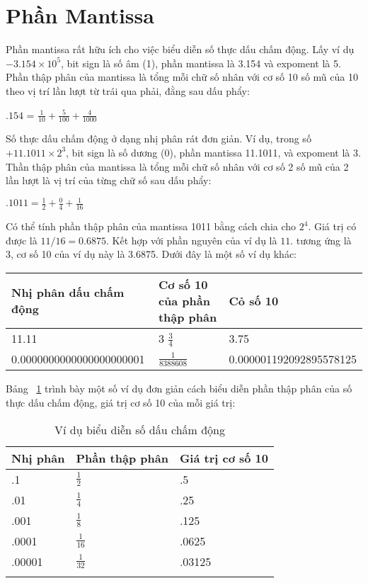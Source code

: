  \section*{Phần Mantissa}
 	Phần mantissa rất hữu ích cho việc biểu diễn số thực dấu chấm động. Lấy ví dụ $-3.154 \times 10^5$, bit sign là số âm (1), phần mantissa là 3.154 và expoment là 5. Phần thập phân của mantissa là tổng mỗi chữ số nhân với cơ số 10 số mũ của 10 theo vị trí lần lượt từ trái qua phải, đằng sau dấu phẩy:
 	
 		$.154$ = $\frac{1}{10} + \frac{5}{100} + \frac{4}{1000}$
 		
 	Số thực dấu chấm động ở dạng nhị phân rát đơn giản. Ví dụ, trong số $+11.1011 \times 2^3$, bit sign là số dương (0), phần mantissa 11.1011, và expoment là 3. Thần thập phân của mantissa là tổng mỗi chữ số nhân với cơ số 2 số mũ của 2 lần lượt là vị trí của từng chữ số sau dấu phẩy:
 	
 		$.1011 = \frac{1}{2}+ \frac{0}{4} + \frac{1}{16}$
 		
 		Có thể tính phần thập phân của mantissa 1011 bằng cách chia cho $2^4$. Giá trị có được là $11/16 = 0.6875$. Kết hợp với phần nguyên của ví dụ là $11.$ tương ứng là 3, cơ số 10 của ví dụ này là 3.6875. Dưới đây là một số ví dụ khác:
 		\begin{longtable}{|l|l|l|}
 			\hline 
 				Nhị phân dấu chấm động & Cơ số 10 của phần thập phân & Cỏ số 10 \\
 			\hline
 			\hline
 				11.11 & 3 $\frac{3}{4}$ & 3.75\\
 			\hline
 				0.0000000000000000000001 & $\frac{1}{8388608}$ & 0.000001192092895578125 \\
 			\hline
 		\end{longtable}
 		
 		Bảng ~\ref{tb:VDBinary} trình bày một số ví dụ đơn giản cách biểu diễn phần thập phân của số thực dấu chấm động, giá trị cơ số 10 của mỗi giá trị:
 		\begin{longtable}{|l|l|l|}
 			\hline
 				Nhị phân & Phần thập phân & Giá trị cơ số 10 \\
 			\hline
 			\hline
 				.1 & $\frac{1}{2}$ & .5 \\
 			\hline
 				.01 &$ \frac{1}{4}$ & .25 \\
 			\hline
 				.001 & $\frac{1}{8}$ & .125 \\
 			\hline
 				.0001 & $\frac{1}{16}$ &.0625 \\
 			\hline
 				.00001 & $\frac{1}{32}$ & .03125 \\ 			
 			\hline
 			\caption{Ví dụ biểu diễn số dấu chấm động}
 			\label{tb:VDBinary}
 		\end{longtable}
 		

